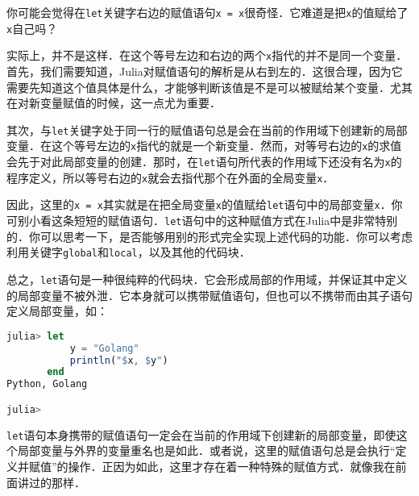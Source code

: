 你可能会觉得在\verb|let|关键字右边的赋值语句\verb|x = x|很奇怪．它难道是把\verb|x|的值赋给了\verb|x|自己吗？

实际上，并不是这样．在这个等号左边和右边的两个\verb|x|指代的并不是同一个变量．首先，我们需要知道，Julia对赋值语句的解析是从右到左的．这很合理，因为它需要先知道这个值具体是什么，才能够判断该值是不是可以被赋给某个变量．尤其在对新变量赋值的时候，这一点尤为重要．

其次，与\verb|let|关键字处于同一行的赋值语句总是会在当前的作用域下创建新的局部变量．在这个等号左边的\verb|x|指代的就是一个新变量．然而，对等号右边的\verb|x|的求值会先于对此局部变量的创建．那时，在\verb|let|语句所代表的作用域下还没有名为\verb|x|的程序定义，所以等号右边的\verb|x|就会去指代那个在外面的全局变量\verb|x|．

因此，这里的\verb|x = x|其实就是在把全局变量\verb|x|的值赋给\verb|let|语句中的局部变量\verb|x|．你可别小看这条短短的赋值语句．\verb|let|语句中的这种赋值方式在Julia中是非常特别的．你可以思考一下，是否能够用别的形式完全实现上述代码的功能．你可以考虑利用关键字\verb|global|和\verb|local|，以及其他的代码块．

总之，\verb|let|语句是一种很纯粹的代码块．它会形成局部的作用域，并保证其中定义的局部变量不被外泄．它本身就可以携带赋值语句，但也可以不携带而由其子语句定义局部变量，如：

\begin{lstlisting}[language=julia]
julia> let  
           y = "Golang"
           println("$x, $y")
       end
Python, Golang

julia> 
\end{lstlisting}

\verb|let|语句本身携带的赋值语句一定会在当前的作用域下创建新的局部变量，即使这个局部变量与外界的变量重名也是如此．或者说，这里的赋值语句总是会执行“定义并赋值”的操作．正因为如此，这里才存在着一种特殊的赋值方式．就像我在前面讲过的那样．